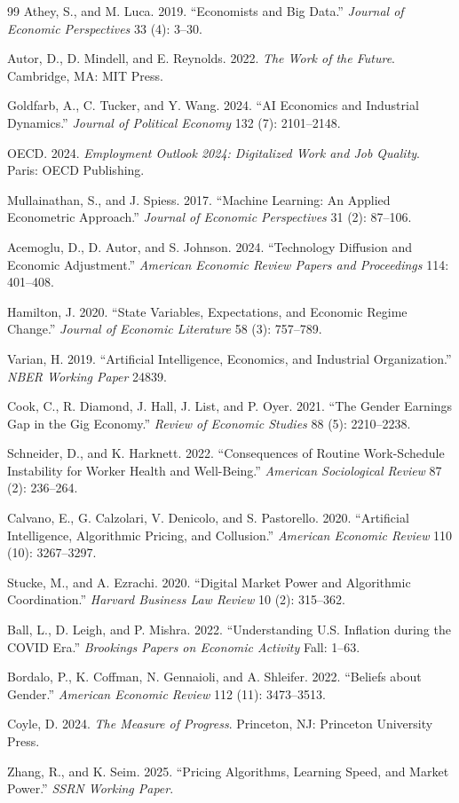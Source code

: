 \documentclass[12pt]{article}
\begin{document}

\begin{thebibliography}{99}
 Athey, S., and M. Luca. 2019. ``Economists and Big Data.'' \textit{Journal of Economic Perspectives} 33 (4): 3--30.

 Autor, D., D. Mindell, and E. Reynolds. 2022. \textit{The Work of the Future}. Cambridge, MA: MIT Press.

 Goldfarb, A., C. Tucker, and Y. Wang. 2024. ``AI Economics and Industrial Dynamics.'' \textit{Journal of Political Economy} 132 (7): 2101--2148.

 OECD. 2024. \textit{Employment Outlook 2024: Digitalized Work and Job Quality}. Paris: OECD Publishing.

 Mullainathan, S., and J. Spiess. 2017. ``Machine Learning: An Applied Econometric Approach.'' \textit{Journal of Economic Perspectives} 31 (2): 87--106.

 Acemoglu, D., D. Autor, and S. Johnson. 2024. ``Technology Diffusion and Economic Adjustment.'' \textit{American Economic Review Papers and Proceedings} 114: 401--408.

 Hamilton, J. 2020. ``State Variables, Expectations, and Economic Regime Change.'' \textit{Journal of Economic Literature} 58 (3): 757--789.

 Varian, H. 2019. ``Artificial Intelligence, Economics, and Industrial Organization.'' \textit{NBER Working Paper} 24839.

 Cook, C., R. Diamond, J. Hall, J. List, and P. Oyer. 2021. ``The Gender Earnings Gap in the Gig Economy.'' \textit{Review of Economic Studies} 88 (5): 2210--2238.

 Schneider, D., and K. Harknett. 2022. ``Consequences of Routine Work-Schedule Instability for Worker Health and Well-Being.'' \textit{American Sociological Review} 87 (2): 236--264.

 Calvano, E., G. Calzolari, V. Denicolo, and S. Pastorello. 2020. ``Artificial Intelligence, Algorithmic Pricing, and Collusion.'' \textit{American Economic Review} 110 (10): 3267--3297.

 Stucke, M., and A. Ezrachi. 2020. ``Digital Market Power and Algorithmic Coordination.'' \textit{Harvard Business Law Review} 10 (2): 315--362.

 Ball, L., D. Leigh, and P. Mishra. 2022. ``Understanding U.S. Inflation during the COVID Era.'' \textit{Brookings Papers on Economic Activity} Fall: 1--63.

 Bordalo, P., K. Coffman, N. Gennaioli, and A. Shleifer. 2022. ``Beliefs about Gender.'' \textit{American Economic Review} 112 (11): 3473--3513.

 Coyle, D. 2024. \textit{The Measure of Progress}. Princeton, NJ: Princeton University Press.

 Zhang, R., and K. Seim. 2025. ``Pricing Algorithms, Learning Speed, and Market Power.'' \textit{SSRN Working Paper}.
\end{thebibliography}
\end{document}
